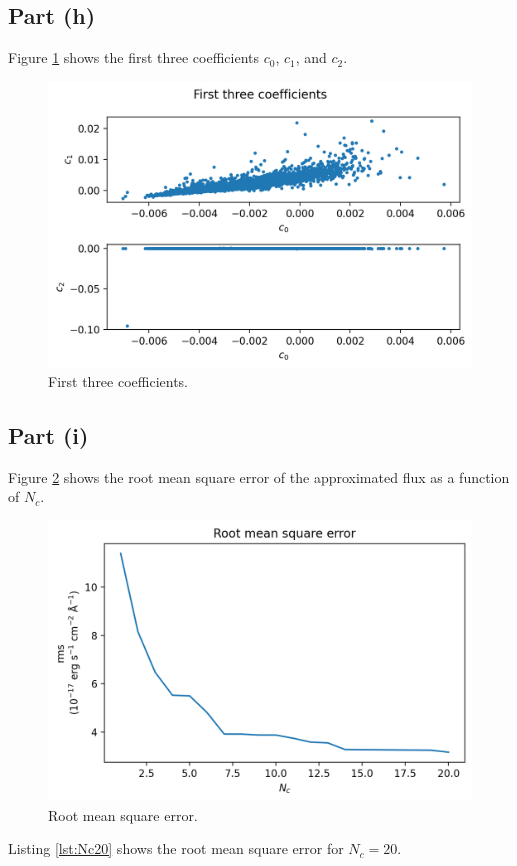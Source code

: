 \documentclass[11pt]{article}
\begin{document}
\subsection{Part (h)}
Figure \ref{fig:3coeff} shows the first three coefficients $c_0$, $c_1$, and $c_2$.
\begin{figure}[H]
    \centering
    \includegraphics[scale = 0.75]{images/ps6-1h.png}
    \caption{First three coefficients.}
    \label{fig:3coeff}
\end{figure}

\subsection{Part (i)}
Figure \ref{fig:rms} shows the root mean square error of the approximated flux as a function of $N_c$.
\begin{figure}[H]
    \centering
    \includegraphics[scale = 0.75]{images/ps6-1i.png}
    \caption{Root mean square error.}
    \label{fig:rms}
\end{figure}

Listing \ref{lst:Nc20} shows the root mean square error for $N_c = 20$.

\end{document}
